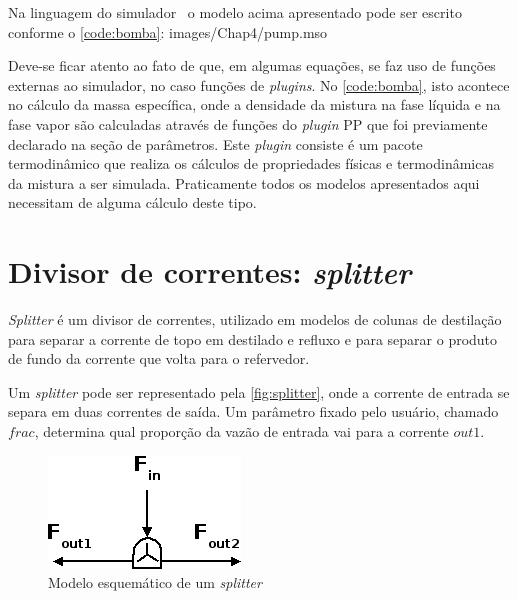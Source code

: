 
Na linguagem do simulador \emso\ o modelo acima apresentado pode ser escrito
conforme o \autoref{code:bomba}:  {images/Chap4/pump.mso}

Deve-se ficar atento ao fato de que, em algumas equações, se faz uso de funções externas ao simulador, no caso
funções de \textit{plugins}. No \autoref{code:bomba}, isto acontece no cálculo da massa específica, onde a
densidade da mistura na fase líquida e na fase vapor são calculadas através de funções do \textit{plugin} PP
que foi previamente declarado na seção de parâmetros. Este \textit{plugin} consiste é um pacote termodinâmico
que realiza os cálculos de propriedades físicas e termodinâmicas da mistura a ser simulada. Praticamente todos os
modelos apresentados aqui necessitam de alguma cálculo deste tipo.


\section{Divisor de correntes: \textit{splitter}} \label{sec:modelosplitter}
\textit{Splitter} é um divisor de correntes, utilizado em modelos de colunas de destilação para separar a corrente
de topo em destilado e refluxo e para separar o produto de fundo da corrente que volta para
o refervedor.

Um \textit{splitter} pode ser representado pela \autoref{fig:splitter}, onde a corrente de entrada se
separa em duas correntes de saída. Um parâmetro fixado pelo usuário, chamado $frac$, determina qual proporção da vazão de
entrada vai para a corrente $out1$.
\begin{figure}[htb]
\centering \includegraphics[scale=0.9]{images/Chap3/esquemasplitter2.png}
\caption{Modelo esquemático de um \textit{splitter}}
\label{fig:splitter}
\end{figure}

